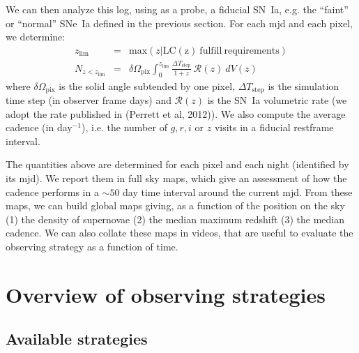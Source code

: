 \documentclass [11pt,a4paper]{article}
\begin{document}
We can then analyze this log, using as a probe, a fiducial SN~Ia,
e.g. the ``faint'' or ``normal'' SNe~Ia defined in the previous
section. For each mjd and each pixel, we determine:
\begin{eqnarray}
  z_{\mathrm{lim}} & = & \mathrm{max}\left(z | \mathrm{LC(z)\ fulfill\ requirements}\right) \\
  N_{z<z_{\mathrm{lim}}} &= & \delta\Omega_{\mathrm{pix}} \int_0^{z_\mathrm{lim}} \frac{\Delta T_{\mathrm{step}}}{1+z}\ {\mathcal{R}}(z)\ dV(z)
\end{eqnarray}
where $\delta\Omega_{\mathrm{pix}}$ is the solid angle subtended by
one pixel, $\Delta T_{\mathrm{step}}$ is the simulation time step (in
observer frame days) and $\mathcal{R}(z)$ is the SN~Ia volumetric rate
(we adopt the rate published in (Perrett et al, 2012)).  We also
compute the average cadence (in day$^{-1}$), i.e. the number of $g, r,
i$ or $z$ visits in a fiducial restframe interval.

The quantities above are determined for each pixel and each night
(identified by its mjd).  We report them in full sky maps, which give
an assessment of how the cadence performs in a $\sim 50$ day time
interval around the current mjd. From these maps, we can build global
maps giving, as a function of the position on the sky (1) the density
of supernovae (2) the median maximum redshift (3) the median cadence.
We can also collate these maps in videos, that are useful to evaluate
the observing strategy as a function of time.

\section{Overview of observing strategies}


\subsection{Available strategies}
\end{document}
